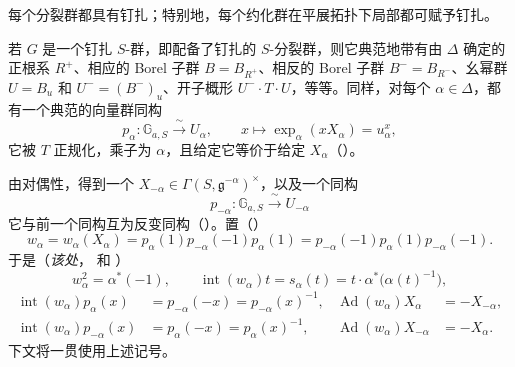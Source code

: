 每个分裂群都具有钉扎；特别地，每个约化群在平展拓扑下局部都可赋予钉扎。


若 \(G\) 是一个钉扎 \(S\)-群，即配备了钉扎的 \(S\)-分裂群，则它典范地带有由 \(\Delta\) 确定的正根系 \(R^+\)、相应的 Borel 子群 \(B=B_{R^+}\)、相反的 Borel 子群 \(B^-=B_{R^-}\)、幺幂群 \(U=B_u\) 和 \(U^-=(B^-)_{u}\)、开子概形 \(U^-\cdot T\cdot U\)，等等。同样，对每个 \(\alpha\in\Delta\)，都有一个典范的向量群同构
\[
  p_\alpha:\mathbb G_{a,S}\xrightarrow{\ \sim\ }U_\alpha,
  \qquad x\longmapsto \exp_\alpha(xX_\alpha)=u_\alpha^x,
\]
它被 \(T\) 正规化，乘子为 \(\alpha\)，且给定它等价于给定 \(X_\alpha\)（）。

由对偶性，得到一个 \(X_{-\alpha}\in\Gamma(S,\mathfrak g^{-\alpha})^\times\)，以及一个同构
\[
  p_{-\alpha}:\mathbb G_{a,S}\xrightarrow{\ \sim\ }U_{-\alpha}
\]
它与前一个同构互为反变同构（）。置（）
\[
  w_\alpha=w_\alpha(X_\alpha)
  =p_\alpha(1)p_{-\alpha}(-1)p_\alpha(1)
  =p_{-\alpha}(-1)p_\alpha(1)p_{-\alpha}(-1).
\]
于是（\textit{该处}， 和 ）
\[
  w_\alpha^2=\alpha^\ast(-1),\qquad
  \operatorname{int}(w_\alpha)t
    =s_\alpha(t)=t\cdot\alpha^\ast\!\bigl(\alpha(t)^{-1}\bigr),
\]
\[
\begin{aligned}
  \operatorname{int}(w_\alpha)p_\alpha(x)
    &=p_{-\alpha}(-x)=p_{-\alpha}(x)^{-1},&
  \operatorname{Ad}(w_\alpha)X_\alpha&=-X_{-\alpha},\\
  \operatorname{int}(w_\alpha)p_{-\alpha}(x)
    &=p_\alpha(-x)=p_\alpha(x)^{-1},&
  \operatorname{Ad}(w_\alpha)X_{-\alpha}&=-X_\alpha .
\end{aligned}
\]
下文将一贯使用上述记号。


